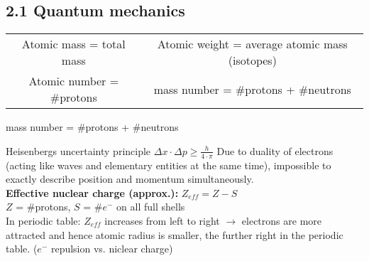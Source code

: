 \subsection{2.1 Quantum mechanics}
    \begin{scriptsize}
        \begin{tabular}{c c}
            Atomic mass = total mass & Atomic weight = average atomic mass (isotopes)\\
            Atomic number = \#protons & mass number = \#protons + \#neutrons
        \end{tabular}
    \end{scriptsize}
    
            \item mass number = \#protons + \#neutrons
        
        Heisenbergs uncertainty principle $\Delta x \cdot \Delta p \geq \frac{h}{4 \cdot \pi}$ Due to duality of electrons (acting like waves and elementary entities at the same time), impossible to exactly describe position and momentum simultaneously.\\
        \textbf{Effective nuclear charge (approx.):}   $Z_{eff} = Z-S$\\
        $Z$ = \#protons, $S$ = \#$e^-$ on all full shells
        \vspace{1mm}\\
        In periodic table: $Z_{eff}$ increases from left to right $\rightarrow$ electrons are more attracted and hence atomic radius is smaller, the further right in the periodic table. ($e^-$ repulsion vs. niclear charge)
        \vspace*{0.0em}